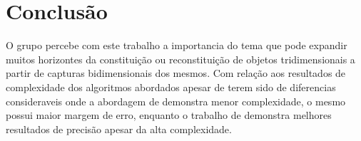 \documentclass[portuguese]{sbrt}
\begin{document}
\section{Conclusão}
\label{sec:conclusao}
O grupo percebe com este trabalho a importancia do tema que pode expandir muitos horizontes da constituição ou reconstituição de objetos tridimensionais a partir de capturas bidimensionais dos mesmos. Com relação aos resultados de complexidade dos algoritmos abordados apesar de terem sido de diferencias consideraveis onde a abordagem de \cite{Zhang} demonstra menor complexidade, o mesmo possui maior margem de erro, enquanto o trabalho de \cite{Svoboda} demonstra melhores resultados de precisão apesar da alta complexidade. 

 

\end{document}
